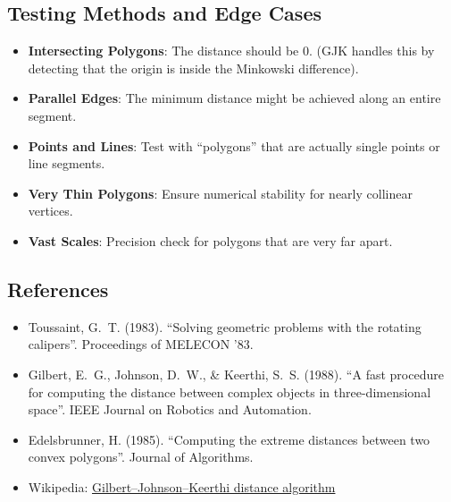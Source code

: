 \subsection{Testing Methods and Edge Cases}
\begin{itemize}
    \item \textbf{Intersecting Polygons}: The distance should be 0. (GJK handles this by detecting that the origin is inside the Minkowski difference).
    \item \textbf{Parallel Edges}: The minimum distance might be achieved along an entire segment.
    \item \textbf{Points and Lines}: Test with ``polygons'' that are actually single points or line segments.
    \item \textbf{Very Thin Polygons}: Ensure numerical stability for nearly collinear vertices.
    \item \textbf{Vast Scales}: Precision check for polygons that are very far apart.
\end{itemize}

\subsection{References}
\begin{itemize}
    \item Toussaint, G.~T. (1983). ``Solving geometric problems with the rotating calipers''. Proceedings of MELECON '83.
    \item Gilbert, E.~G., Johnson, D.~W., \& Keerthi, S.~S. (1988). ``A fast procedure for computing the distance between complex objects in three-dimensional space''. IEEE Journal on Robotics and Automation.
    \item Edelsbrunner, H. (1985). ``Computing the extreme distances between two convex polygons''. Journal of Algorithms.
    \item Wikipedia: \href{https://en.wikipedia.org/wiki/Gilbert\%E2\%80\%93Johnson\%E2\%80\%93Keerthi_distance_algorithm}{Gilbert--Johnson--Keerthi distance algorithm}
\end{itemize}
